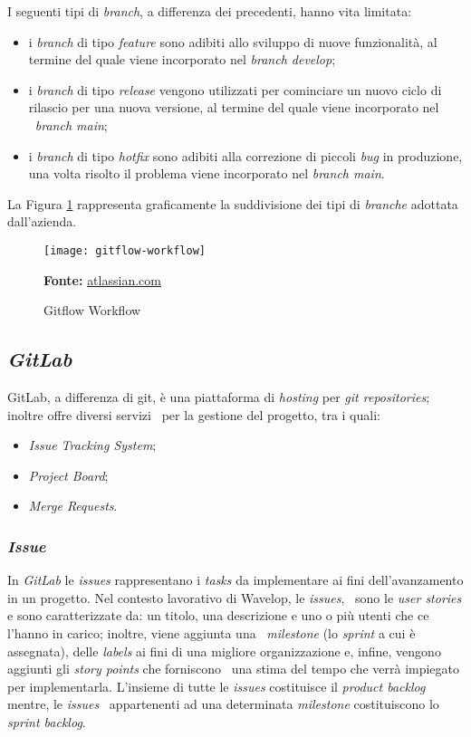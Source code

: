 I seguenti tipi di \emph{branch}, a differenza dei precedenti, hanno vita limitata: \
\begin{itemize}
  \item i \emph{branch} di tipo \emph{feature} sono adibiti allo sviluppo di nuove funzionalità, al termine del quale viene incorporato nel \emph{branch develop}; 
  \item i \emph{branch} di tipo \emph{release} vengono utilizzati per cominciare un nuovo ciclo di rilascio per una nuova versione, al termine del quale viene incorporato nel \
  \emph{branch main}; 
  \item i \emph{branch} di tipo \emph{hotfix} sono adibiti alla correzione di piccoli \emph{bug} in produzione, una volta risolto il problema viene incorporato nel \emph{branch main}.
\end{itemize}

La Figura \ref{fig:gitflow} rappresenta graficamente la suddivisione dei tipi di \emph{branche} adottata dall'azienda.
\vspace{10pt}
  \begin{figure}[!ht]
    \begin{center}
      \texttt{[image: gitflow-workflow]}
      \caption{Gitflow Workflow}
      \textbf{Fonte:} \href{https://www.atlassian.com}{atlassian.com}
      \label{fig:gitflow}
    \end{center}
  \end{figure}
\vspace{10pt} 

\newpage
\subsection{\emph{GitLab}}
GitLab, a differenza di git, è una piattaforma di \emph{hosting} per \emph{git repositories}; inoltre offre diversi servizi \
per la gestione del progetto, tra i quali:

\begin{itemize}
  \item \emph{Issue Tracking System};
  \item \emph{Project Board};
  \item \emph{Merge Requests}.
\end{itemize}

\subsubsection{\emph{Issue}}
In \emph{GitLab} le \emph{issues} rappresentano i \emph{tasks} da implementare ai fini dell'avanzamento in un progetto. Nel contesto lavorativo di Wavelop, le \emph{issues}, \
sono le \emph{user stories} e sono caratterizzate da: un titolo, una descrizione e uno o più utenti che ce l'hanno in carico; inoltre, viene aggiunta una \
\emph{milestone} (lo \emph{sprint} a cui è assegnata), delle \emph{labels} ai fini di una migliore organizzazione e, infine, vengono aggiunti gli \emph{story points} che forniscono \
una stima del tempo che verrà impiegato per implementarla. L'insieme di tutte le \emph{issues} costituisce il \emph{product backlog} mentre, le \emph{issues} \
appartenenti ad una determinata \emph{milestone} costituiscono lo \emph{sprint backlog}.

